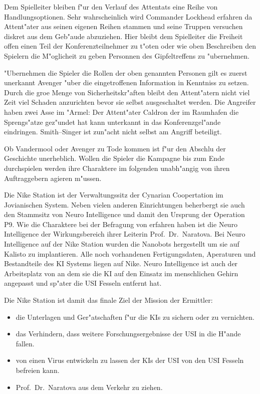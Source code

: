 \begin{remarks}
	Dem Spielleiter bleiben f"ur den Verlauf des Attentats eine Reihe von Handlungsoptionen. Sehr wahrscheinlich wird Commander Lockhead erfahren da\3 Attent"ater aus seinen eigenen Reihen stammen und seine Truppen versuchen diskret aus dem Geb"aude abzuziehen. Hier bleibt dem Spielleiter die Freiheit offen einen Teil der Konferenzteilnehmer zu t"oten oder wie oben Beschreiben den Spielern die M"oglicheit zu geben Personnen des Gipfeltreffens zu "ubernehmen.
	
	"Ubernehmen die Spieler die Rollen der oben genannten Personen gilt es zuerst unerkannt Avenger "uber die eingetroffenen Information in Kenntniss zu setzen. Durch die gro\3e Menge von Sicherheitskr"aften bleibt den Attent"atern nicht viel Zeit viel Schaden anzurichten bevor sie selbst ausgeschaltet werden. Die Angreifer haben zwei Asse im "Armel: Der Attent"ater Caldron der im Raumhafen die Sprengs"atze gez"undet hat kann unterkannt in das Konferenzgel"ande eindringen. Smith--Singer ist zun"acht nicht selbst am Angriff beteiligt.
	
	Ob Vandermool oder Avenger zu Tode kommen ist f"ur den Abschlu\3 der Geschichte unerheblich. Wollen die Spieler die Kampagne bis zum Ende durchspielen werden ihre Charaktere im folgenden unabh"angig von ihren Auftraggebern agieren m"ussen.
\end{remarks}



Die Nike Station ist der Verwaltungssitz der Cynarian Coopertation im Jovianischen System. Neben vielen anderen Einrichtungen beherbergt sie auch den Stammsitz von Neuro Intelligence und damit den Ursprung der Operation P9. Wie die Charaktere bei der Befragung von \ml{} erfahren haben ist die Neuro Intelligence der Wirkungsbereich ihrer Leiterin Prof.~Dr.~Naratova. Bei Neuro Intelligence auf der Nike Station wurden die Nanobots hergestellt um sie auf Kalisto zu implantieren. Alle noch vorhandenen Fertigungsdaten, Aperaturen und Bestandteile des KI Systems liegen auf Nike. Neuro Intelligence ist auch der Arbeitsplatz von \ml{} an dem sie die KI auf den Einsatz im menschlichen Gehirn angepasst und sp"ater die USI Fesseln entfernt hat.

Die Nike Station ist damit das finale Ziel der Mission der Ermittler:

\begin{itemize}
	\item die Unterlagen und Ger"atschaften f"ur die KIs zu sichern oder zu vernichten.
	\item das Verhindern, dass weitere Forschungsergebnisse der USI in die H"ande fallen.
	\item von \ml{} einen Virus entwickeln zu lassen der KIs der USI von den USI Fesseln befreien kann.
	\item Prof.~Dr.~Naratova aus dem Verkehr zu ziehen.
\end{itemize}

